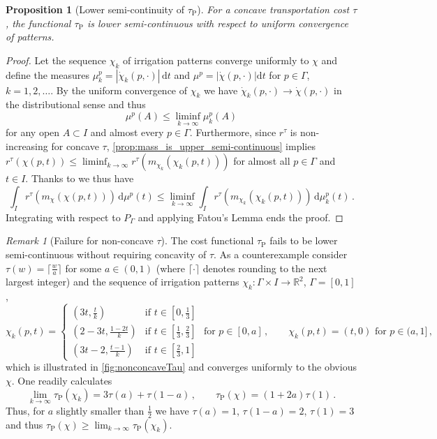 \documentclass[10pt,a4paper,oneside,final]{article}
\newcommand{\R}{{\mathbb{R}}}
\newcommand{\de}{{\mathrm{d}}}
\newcommand{\reSpace}{\Gamma}
\newcommand{\reMeasure}{P_{\reSpace}}
\newcommand{\JEnMMS}[1][\tau]{#1_{\mathrm{P}}}%
\numberwithin{equation}{section}
\theoremstyle{plain}
\newtheorem{proposition}[theorem]{Proposition}
\theoremstyle{definition}
\theoremstyle{remark}
\newtheorem{remark}[theorem]{Remark}
\begin{document}
\begin{proposition}[Lower semi-continuity of $\JEnMMS$]\label{prop:urban_planning_energy_is_lower_semi-continuous}
For a concave transportation cost $\tau$, the functional $\JEnMMS$ is lower semi-continuous with respect to uniform convergence of patterns.
\end{proposition}

\begin{proof}
Let the sequence $\chi_k$ of irrigation patterns converge uniformly to $\chi$
and define the measures $\mu_k^p = |\dot\chi_k(p,\cdot)|\,\de t$ and $\mu^p = |\dot\chi(p,\cdot)|\de t$ for $p\in\reSpace$, $k=1,2,\ldots$.
By the uniform convergence of $\chi_k$ we have $\dot\chi_k(p,\cdot)\to\dot\chi(p,\cdot)$ in the distributional sense and thus
\begin{displaymath}
\mu^p(A)\leq\liminf_{k\to\infty}\mu_k^p(A)
\end{displaymath}
for any open $A\subset I$ and almost every $p\in\reSpace$.
Furthermore, since $r^\tau$ is non-increasing for concave $\tau$, \cref{prop:mass_is_upper_semi-continuous} implies $r^\tau(\chi(p,t)) \leq \liminf_{k \to \infty} r^\tau(m_{\chi_k}(\chi_k(p,t)))$ for almost all $p\in\reSpace$ and $t\in I$.
Thanks to \cite[Def.\,C.1 \& Thm.\,C.1]{Maddalena-Solimini-Synchronic} we thus have
\begin{displaymath}
\int_I r^\tau(m_\chi(\chi(p,t))) \,\de\mu^p(t) \leq \liminf_{k\to\infty} \int_I r^\tau(m_{\chi_k}(\chi_k(p,t))) \,\de\mu_k^p(t)\,.
\end{displaymath}
Integrating with respect to $\reMeasure$ and applying Fatou's Lemma ends the proof.
\end{proof}

\begin{remark}[Failure for non-concave $\tau$]\label{rem:nonconcaveTau}
The cost functional $\JEnMMS$ fails to be lower semi-continuous without requiring concavity of $\tau$.
As a counterexample consider $\tau(w)=\lceil\frac wa\rceil$ for some $a\in(0,1)$ (where $\lceil\cdot\rceil$ denotes rounding to the next largest integer) and the sequence of irrigation patterns $\chi_k:\reSpace\times I\to\R^2$, $\reSpace=[0,1]$,
\begin{equation*}
\chi_k(p,t)=\begin{cases}(3t,\frac tk)&\text{if }t\in[0,\frac13]\\(2-3t,\frac{1-2t}k)&\text{if }t\in[\frac13,\frac23]\\(3t-2,\frac{t-1}k)&\text{if }t\in[\frac23,1]\end{cases}\text{ for }p\in[0,a]\,,\qquad
\chi_k(p,t)=(t,0)\text{ for }p\in(a,1]\,,
\end{equation*}
which is illustrated in \cref{fig:nonconcaveTau} and converges uniformly to the obvious $\chi$.
One readily calculates
\begin{equation*}
\lim_{k\to\infty}\JEnMMS(\chi_k)=3\tau(a)+\tau(1-a)\,,\qquad
\JEnMMS(\chi)=(1+2a)\tau(1)\,.
\end{equation*}
Thus, for $a$ slightly smaller than $\frac12$ we have $\tau(a)=1$, $\tau(1-a)=2$, $\tau(1)=3$ and thus $\JEnMMS(\chi)\geq\lim_{k\to\infty}\JEnMMS(\chi_k)$.
\end{remark}
\end{document}
